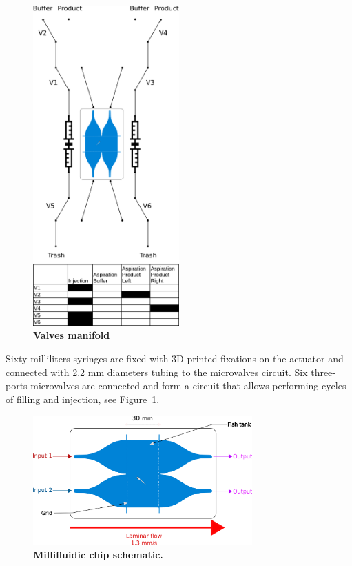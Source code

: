     \begin{figure}[h!]
      \centering
      \includegraphics[width=0.50\textwidth]{part_2/assets/valve_schematic.png}
      \caption{\textbf{Valves manifold}}
      \label{valves_schematic}
    \end{figure}

  Sixty-milliliters syringes are fixed with 3D printed fixations on the actuator and connected with 2.2 mm diameters tubing to the microvalves circuit. Six three-ports microvalves are connected and form a circuit that allows performing cycles of filling and injection, see Figure~\ref{valves_schematic}.

    \begin{figure}[h]
      \centering
      \includegraphics[width=0.75\textwidth]{part_2/assets/chip.png}
      \caption{\textbf{Millifluidic chip schematic.}}
      \label{dual_chip}
    \end{figure}

